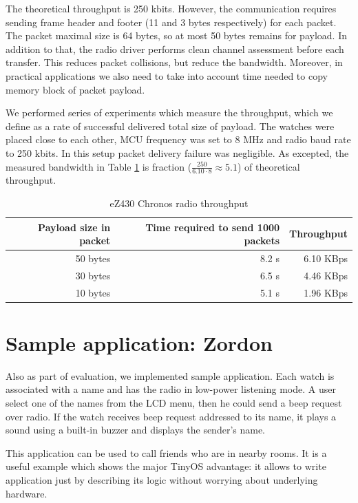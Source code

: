 The theoretical throughput is 250 kbits.
However, the communication requires sending frame header and footer (11 and 3 bytes respectively) for each packet.
The packet maximal size is 64 bytes, so at most 50 bytes remains for payload.
In addition to that, the radio driver performs clean channel assessment before each transfer.
This reduces packet collisions, but reduce the bandwidth.
Moreover, in practical applications we also need to take into account time needed to copy memory block of packet payload.


We performed series of experiments which measure the throughput, which we define as a rate of successful delivered total size of payload.
The watches were placed close to each other, MCU frequency was set to 8 MHz and radio baud rate to 250 kbits.
In this setup packet delivery failure was negligible.
As excepted, the measured bandwidth in Table \ref{tab:radio-throughput} is fraction ($\frac{250}{6.10 \cdot 8} \approx 5.1$) of theoretical throughput.

\begin{table}[h]
  \centering
    \begin{tabular}{|r|r|r|}
        \hline
        \textbf{Payload size in packet} & \textbf{Time required to send 1000 packets} & \textbf{Throughput} \\ \hline
        50 bytes& 8.2 s & 6.10 KBps \\ \hline
        30 bytes& 6.5 s & 4.46 KBps \\ \hline
        10 bytes& 5.1 s & 1.96 KBps \\ \hline
    \end{tabular}
  \caption{eZ430 Chronos radio throughput}
  \label{tab:radio-throughput}
\end{table}



\section{Sample application: Zordon}

Also as part of evaluation, we implemented sample application.
Each watch is associated with a name and has the radio in low-power listening mode.
A user select one of the names from the LCD menu, then he could send a beep request over radio.
If the watch receives beep request addressed to its name, it plays a sound using a built-in buzzer and displays the sender's name.

This application can be used to call friends who are in nearby rooms.
It is a useful example which shows the major TinyOS advantage: it allows to write application just by describing its logic without worrying about underlying hardware.







